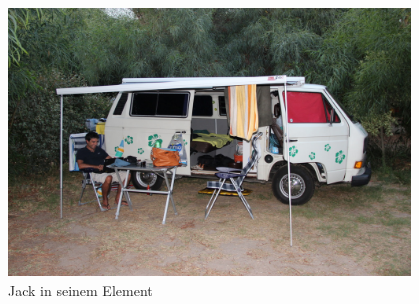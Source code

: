 \begin{figure}[hb]
    \centering
    \includegraphics[width=0.95\textwidth]{../Bilder/Sardinien/38.jpg}
    \caption{Jack in seinem Element}
    \label{img:Sardinien4}
\end{figure}

\newpage

